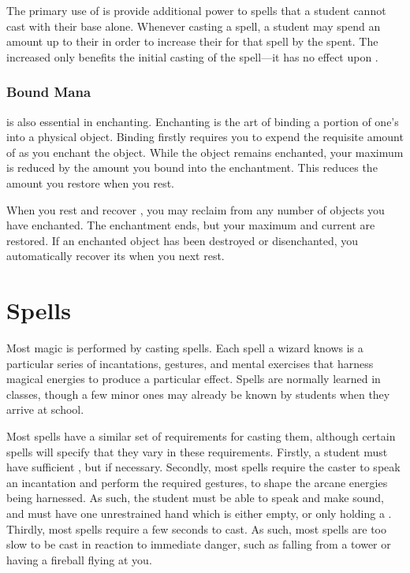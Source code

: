 The primary use of {\mana} is provide additional power to spells that a student cannot cast with their base {\focus} alone.
Whenever casting a spell, a student may spend an amount {\mana} up to their {\overchannel} in order to increase their {\focus} for that spell by the {\mana} spent.
The increased {\focus} only benefits the initial casting of the spell---it has no effect upon {\concentration}.

\subsubsection{Bound Mana}

\capital{\mana} is also essential in enchanting.
Enchanting is the art of binding a portion of one's {\mana} into a physical object.
Binding {\mana} firstly requires you to expend the requisite amount of {\mana} as you enchant the object.
While the object remains enchanted, your maximum {\mana} is reduced by the amount you bound into the enchantment.
This reduces the amount you restore when you rest.

When you rest and recover {\mana}, you may reclaim {\mana} from any number of objects you have enchanted.
The enchantment ends, but your maximum and current {\mana} are restored.
If an enchanted object has been destroyed or disenchanted, you automatically recover its {\mana} when you next rest.

\section{Spells}

Most magic is performed by casting spells.
Each spell a wizard knows is a particular series of incantations, gestures, and mental exercises that harness magical energies to produce a particular effect.
Spells are normally learned in classes, though a few minor ones may already be known by students when they arrive at school.

Most spells have a similar set of requirements for casting them, although certain spells will specify that they vary in these requirements.
Firstly, a student must have sufficient {\focus}, but {\overchannelling} if necessary.
Secondly, most spells require the caster to speak an incantation and perform the required gestures, to shape the arcane energies being harnessed.
As such, the student must be able to speak and make sound, and must have one unrestrained hand which is either empty, or only holding a {\castingtool}.
Thirdly, most spells require a few seconds to cast.
As such, most spells are too slow to be cast in reaction to immediate danger, such as falling from a tower or having a fireball flying at you.

